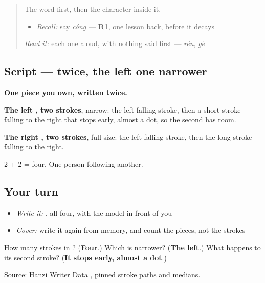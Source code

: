 \label{lesson:ZH-W155-cong-from}



\begin{quote}
The word first, then the character inside it.

\begin{itemize}
\raggedright
  \item \emph{Recall:} say \emph{cóng} — \textbf{R1}, one lesson back, before it decays
\end{itemize}

\begin{quote}
 
\end{quote}

\emph{Read it:} each one aloud, with nothing said first — \emph{rén}, \emph{gè}
\end{quote}

\subsection*{Script —  twice, the left one narrower}

\begin{quote}
\end{quote}

\textbf{One piece you own, written twice.}

\textbf{The left , two strokes}, narrow: the left-falling stroke, then a short stroke falling to the right that stops early, almost a dot, so the second  has room.

\textbf{The right , two strokes}, full size: the left-falling stroke, then the long stroke falling to the right.

2 + 2 = four. One person following another.

\subsection*{Your turn}
\begin{itemize}
\raggedright
  \item \emph{Write it:} , all four, with the model in front of you
  \item \emph{Cover:} write it again from memory, and count the pieces, not the strokes
\end{itemize}

\begin{tcolorbox}[breakable,colback=teal!4,colframe=teal!35!black,title={Before you move on}]
How many strokes in ? (\textbf{Four}.) Which  is narrower? (\textbf{The left}.) What happens to its second stroke? (\textbf{It stops early, almost a dot}.)

Source: \href{https://raw.githubusercontent.com/chanind/hanzi-writer-data/68d10a4b21150cae5e1ebbd223eed289cf32d90c/data/\%E4\%BB\%8E.json}{Hanzi Writer Data , pinned stroke paths and medians}.
\end{tcolorbox}
